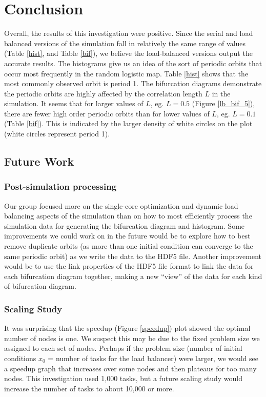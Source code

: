 \documentclass[12pt]{article}
\begin{document}
\section{Conclusion}
Overall, the results of this investigation were positive. Since the
serial and load balanced versions of the simulation fall in relatively
the same range of values (Table \ref{hist}, and Table \ref{bif}), we believe the load-balanced versions output the
accurate results. The histograms give us an idea of the sort of
periodic orbits that occur most frequently in the random logistic
map. Table \ref{hist} shows that the
most commonly observed orbit is period 1. The bifurcation diagrams
demonstrate the periodic orbits are highly affected by the correlation
length $L$ in the simulation. It seems that for larger values of $L$,
eg. $L=0.5$ (Figure \ref{lb_bif_5}), there are fewer high order
periodic orbits than for lower values of $L$, eg. $L=0.1$ (Table \ref{bif}). This is indicated by the
larger density of white circles on the plot (white circles represent
period 1).
\subsection{Future Work}
\subsubsection{Post-simulation processing}
Our group focused more on the single-core optimization and dynamic
load balancing aspects of the simulation than on how to most
efficiently process the simulation data for generating the bifurcation
diagram and histogram. Some improvements we could work on in the
future would be to explore how to best remove duplicate orbits (as
more than one initial condition can converge to the same periodic
orbit) as we write the data to the HDF5 file. Another improvement
would be to use the link properties of the HDF5 file format to link
the data for each bifurcation diagram together, making a new ``view''
of the data for each kind of bifurcation diagram. 
\subsubsection{Scaling Study}
It was surprising that the speedup (Figure \ref{speedup}) plot showed
the optimal number of nodes is one. We suspect this may be due to the
fixed problem size we assigned to each set of nodes. Perhaps if the
problem size (number of initial conditions $x_0$ = number of tasks for
the load balancer) were larger, we would see a speedup graph that
increases over some nodes and then plateaus for too many nodes. This
investigation used 1,000 tasks, but a future scaling study would
increase the number of tasks to about 10,000 or more.


\end{document}
